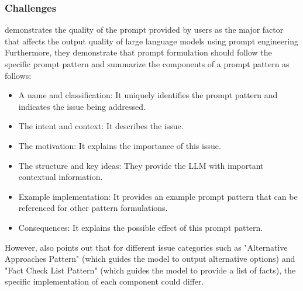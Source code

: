 \documentclass[runningheads]{llncs}
\begin{document}
\subsubsection{Challenges}
\noindent \newline
\cite{White23} demonstrates the quality of the prompt provided by users as the major factor that affects the output quality of large language models using prompt engineering
Furthermore, they demonstrate that prompt formulation should follow the specific prompt pattern and summarize the components of a prompt pattern as follows:
\begin{itemize}
  \item A name and classification: It uniquely identifies the prompt pattern and indicates the issue being addressed.
  \item The intent and context: It describes the issue.
  \item The motivation: It explains the importance of this issue.
  \item The structure and key ideas: They provide the LLM with important contextual information.
  \item Example implementation: It provides an example prompt pattern that can be referenced for other pattern formulations.
  \item Consequences: It explains the possible effect of this prompt pattern.
\end{itemize}
However, \cite{White23} also points out that for different issue categories such as "Alternative Approaches Pattern" (which guides the model to output alternative options) and "Fact Check List Pattern" 
(which guides the model to provide a list of facts), the specific implementation of each component could differ.
\end{document}
